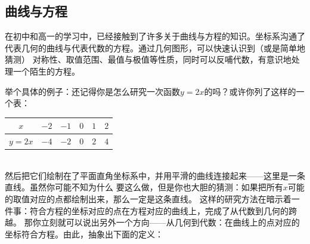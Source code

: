 \subsection{曲线与方程}
在初中和高一的学习中，已经接触到了许多关于曲线与方程的知识。坐标系沟通了
代表几何的曲线与代表代数的方程。通过几何图形，可以快速认识到（或是简单地猜测）
对称性、取值范围、最值与极值等性质，同时可以反哺代数，有意识地处理一个陌生的方程。

举个具体的例子：还记得你是怎么研究一次函数\(y=2x\)的吗？或许你列了这样的一个表：
\begin{table}[h]\centering
        \begin{tabular}{|c|l|l|l|l|l|}
        \hline
        $x $   &$ -2$ & $-1$ & $0$ &$ 1$ & $2$ \\ \hline
        $y=2x$ & $-4 $&$ -2 $& $0$ & $2$ & $4$ \\ \hline
        \end{tabular}
\end{table}\\然后把它们绘制在了平面直角坐标系中，并用平滑的曲线连接起来——这里是一条直线。虽然你可能不知为什么
要这么做，但是你也大胆的猜测：如果把所有\(x\)可能的取值对应的点都绘制出来，那么一定是这条直线。
这样的研究方法在暗示着一件事：符合方程的坐标对应的点在方程对应的曲线上，完成了从代数到几何的跨越。
那你立刻就可以说出另外一个方向——从几何到代数：在曲线上的点对应的坐标符合方程。由此，抽象出下面的定义：

